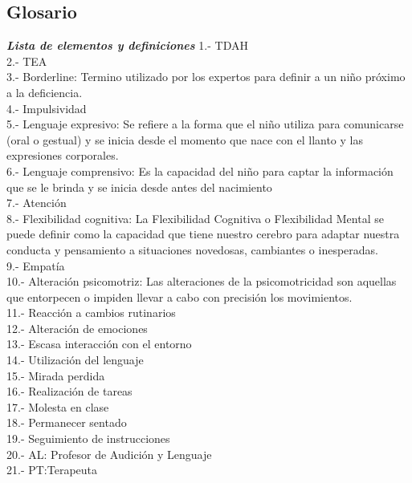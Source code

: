 \documentclass[letterpaper,12pt]{article}
\begin{document}
\subsection{Glosario}
\begin{flushleft}
\textbf{\textit{Lista de elementos y definiciones}}
1.- TDAH \\
2.- TEA\\
3.- Borderline: Termino utilizado por los expertos para definir a un niño próximo a la deficiencia.\\
4.- Impulsividad\\
5.- Lenguaje expresivo: Se refiere a la forma que el niño utiliza para comunicarse (oral o gestual) y se inicia desde el momento que nace con el llanto y las expresiones corporales.\\
6.- Lenguaje comprensivo: Es la capacidad del niño para captar la información que se le brinda y se inicia desde antes del nacimiento\\
7.- Atención\\
8.- Flexibilidad cognitiva: La Flexibilidad Cognitiva o Flexibilidad Mental se puede definir como la capacidad que tiene nuestro cerebro para adaptar nuestra conducta y pensamiento a situaciones novedosas, cambiantes o inesperadas. \\
9.- Empatía\\
10.- Alteración psicomotriz: Las alteraciones de la psicomotricidad son aquellas que entorpecen o impiden llevar a cabo con precisión los movimientos.\\
11.- Reacción a cambios rutinarios\\
12.- Alteración de emociones\\
13.- Escasa interacción con el entorno\\
14.- Utilización del lenguaje\\
15.- Mirada perdida\\
16.- Realización de tareas\\
17.- Molesta en clase\\
18.- Permanecer sentado\\
19.- Seguimiento de instrucciones\\
20.- AL: Profesor de Audición y Lenguaje \\
21.- PT:Terapeuta \\


\end{flushleft}
\end{document}
